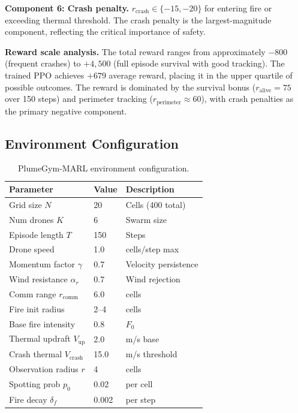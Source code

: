\documentclass[12pt,a4paper]{article}
\begin{document}
\textbf{Component 6: Crash penalty.} $r_{\text{crash}} \in \{-15, -20\}$ for entering fire or exceeding thermal threshold. The crash penalty is the largest-magnitude component, reflecting the critical importance of safety.

\textbf{Reward scale analysis.} The total reward ranges from approximately $-800$ (frequent crashes) to $+4,500$ (full episode survival with good tracking). The trained PPO achieves $+679$ average reward, placing it in the upper quartile of possible outcomes. The reward is dominated by the survival bonus ($r_{\text{alive}} = 75$ over 150 steps) and perimeter tracking ($r_{\text{perimeter}} \approx 60$), with crash penalties as the primary negative component.

\subsection{Environment Configuration}

\begin{table}[t]
\centering
\caption{PlumeGym-MARL environment configuration.}
\label{tab:env_config}
\small
\begin{tabular}{lll}
\toprule
\textbf{Parameter} & \textbf{Value} & \textbf{Description} \\
\midrule
Grid size $N$ & 20 & Cells (400 total) \\
Num drones $K$ & 6 & Swarm size \\
Episode length $T$ & 150 & Steps \\
Drone speed & 1.0 & cells/step max \\
Momentum factor $\gamma$ & 0.7 & Velocity persistence \\
Wind resistance $\alpha_r$ & 0.7 & Wind rejection \\
Comm range $r_{\text{comm}}$ & 6.0 & cells \\
Fire init radius & 2--4 & cells \\
Base fire intensity & 0.8 & $F_0$ \\
Thermal updraft $V_{\text{up}}$ & 2.0 & m/s base \\
Crash thermal $V_{\text{crash}}$ & 15.0 & m/s threshold \\
Observation radius $r$ & 4 & cells \\
Spotting prob $p_0$ & 0.02 & per cell \\
Fire decay $\delta_f$ & 0.002 & per step \\
\bottomrule
\end{tabular}
\end{table}
\end{document}
